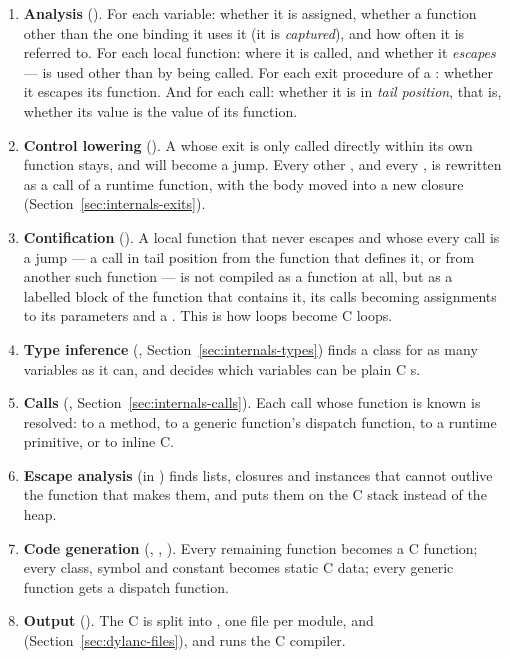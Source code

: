 \begin{enumerate}
\item \textbf{Analysis} (). For each variable:
  whether it is assigned, whether a function other than the one binding
  it uses it (it is \emph{captured}), and how often it is referred to.
  For each local function: where it is called, and whether it
  \emph{escapes} --- is used other than by being called. For each exit
  procedure of a : whether it escapes its function. And
  for each call: whether it is in \emph{tail position}, that is, whether
  its value is the value of its function.

\item \textbf{Control lowering} (). A
   whose exit is only called directly within its own
  function stays, and will become a jump. Every other ,
  and every , is rewritten as a call of a runtime
  function, with the body moved into a new closure
  (Section~\ref{sec:internals-exits}).

\item \textbf{Contification} (). A local function
  that never escapes and whose every call is a jump --- a call in tail
  position from the function that defines it, or from another such
  function --- is not compiled as a function at all, but as a labelled
  block of the function that contains it, its calls becoming
  assignments to its parameters and a . This is how loops
  become C loops.

\item \textbf{Type inference} (,
  Section~\ref{sec:internals-types}) finds a class for as many
  variables as it can, and decides which  variables
  can be plain C s.

\item \textbf{Calls} (,
  Section~\ref{sec:internals-calls}). Each call whose function is known
  is resolved: to a method, to a generic function's dispatch function,
  to a runtime primitive, or to inline C.

\item \textbf{Escape analysis} (in ) finds
   lists, closures and instances that cannot outlive the
  function that makes them, and puts them on the C stack instead of the
  heap.

\item \textbf{Code generation} (,
  , ). Every
  remaining function becomes a C function; every class, symbol and
  constant becomes static C data; every generic function gets a dispatch
  function.

\item \textbf{Output} (). The C is split into
  , one file per module, and 
  (Section~\ref{sec:dylanc-files}), and  runs the C
  compiler.
\end{enumerate}

